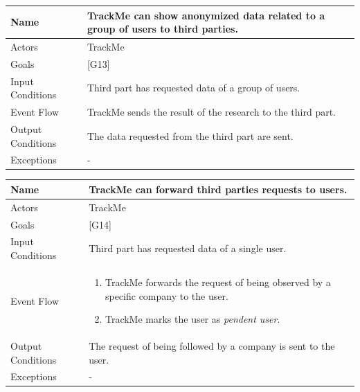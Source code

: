 \documentclass{article}
\begin{document}
\begin{center}
    \begin{tabular}{ | l | p{10cm} |}
    \hline
    Name & TrackMe can show anonymized data related to a group of users to third parties. \\ \hline
    Actors & TrackMe\\ \hline
   	Goals & {[G13]}\\ \hline
    Input Conditions & Third part has requested data of a group of users.\\ \hline
    Event Flow & TrackMe sends the result of the research to the third part. \\ \hline
    Output Conditions & The data requested from the third part are sent. \\ \hline
    Exceptions & -  \\ \hline
    \end{tabular}
\end{center}

\begin{center}
    \begin{tabular}{ | l | p{10cm} |}
    \hline
    Name & TrackMe can forward third parties requests to users. \\ \hline
    Actors & TrackMe\\ \hline
   	Goals & {[G14]}\\ \hline
    Input Conditions & Third part has requested data of a single user.\\ \hline
    Event Flow & \begin{enumerate}
    	\item TrackMe forwards the request of being observed by a specific company to the user.
    	\item TrackMe marks the user as \emph{pendent user}.
    \end{enumerate} \\ \hline
    Output Conditions & The request of being followed by a company is sent to the user. \\ \hline
    Exceptions & -    \\ \hline
    \end{tabular}
\end{center}
\end{document}
